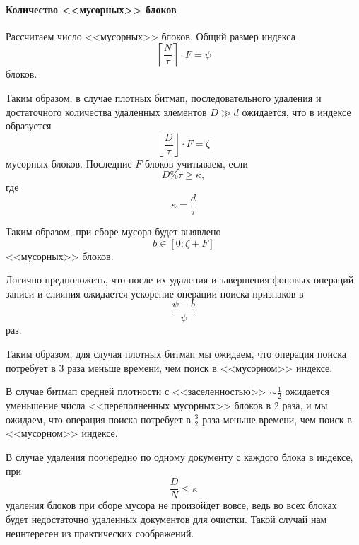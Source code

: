 \paragraph{Количество <<мусорных>> блоков\\}

Рассчитаем число <<мусорных>> блоков. Общий размер индекса
\begin{equation}
    \left\lceil\frac{N}{\tau}\right\rceil \cdot F = \psi
\end{equation}
блоков.

Таким образом, в случае плотных битмап, последовательного удаления и достаточного
количества удаленных элементов $D \gg d$ ожидается, что в индексе образуется
\begin{equation}
    \left\lfloor\frac{D}{\tau}\right\rfloor \cdot F = \zeta
\end{equation}
мусорных блоков. Последние $F$ блоков учитываем, если 
\begin{equation}
    D \% \tau \geq \kappa,
\end{equation}
где
\begin{equation}
    \kappa = \frac{d}{\tau}
\end{equation}

Таким образом, при сборе мусора будет выявлено
\begin{equation}
    b \in \left[0;\zeta + F\right]
\end{equation}
<<мусорных>> блоков.

Логично предположить, что после их удаления и завершения фоновых операций
записи и слияния ожидается ускорение операции поиска признаков в 
\begin{equation}
    \frac{\psi - b}{\psi}
\end{equation}
раз.

Таким образом, для случая плотных битмап мы ожидаем, что операция поиска потребует
в 3 раза меньше времени, чем поиск в <<мусорном>> индексе.

В случае битмап средней плотности с <<заселенностью>> $\sim\frac{1}{2}$ ожидается
уменьшение числа <<переполненных мусорных>> блоков в 2 раза, и мы
ожидаем, что операция поиска потребует в $\frac{3}{2}$ раза меньше времени, чем поиск в
<<мусорном>> индексе.

В случае удаления поочередно по одному документу с каждого блока в индексе, при
\begin{equation}
    \frac{D}{N} \leq \kappa
\end{equation}
удаления блоков при сборе мусора не произойдет вовсе, ведь во всех блоках будет
недостаточно удаленных документов для очистки. Такой случай нам неинтересен из
практических соображений.

